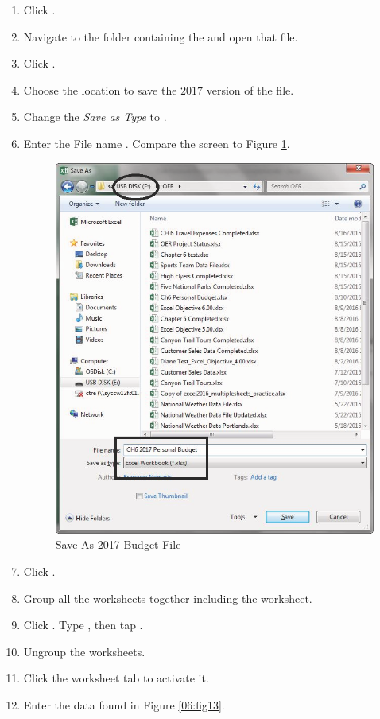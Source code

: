 \begin{enumbox}
	\begin{enumerate}
		\item Click .
		\item Navigate to the folder containing the  and open that file.
		\item Click .
		\item Choose the location to save the $ 2017 $ version of the file.
		\item Change the \textit{Save as Type} to .
		\item Enter the File name . Compare the screen to Figure \ref{06:fig12}.
	
		\begin{figure}[H]
			\centering
			\includegraphics[width=\maxwidth{.95\linewidth}]{gfx/ch06_fig12}
			\caption{Save As 2017 Budget File}
			\label{06:fig12}
		\end{figure}

		\item Click .
		\item Group all the worksheets together including the  worksheet.
		\item Click . Type , then tap .
		\item Ungroup the worksheets.
		\item Click the  worksheet tab to activate it. 
		\item Enter the data found in Figure \ref{06:fig13}.
	

\end{enumerate}
\end{enumbox}
